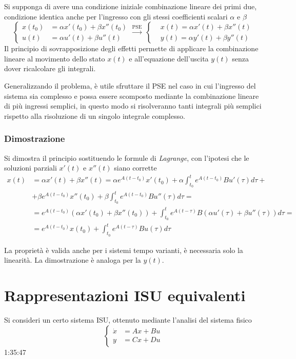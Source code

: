 Si supponga di avere una condizione iniziale combinazione lineare dei primi
due, condizione identica anche per l'ingresso con gli stessi coefficienti
scalari $\alpha$ e $\beta$
$$\left\{\begin{aligned}
x(t_0) &= \alpha x'(t_0) + \beta x''(t_0)\\
u(t) &= \alpha u'(t) + \beta u''(t)
\end{aligned}\right.\stackrel{\text{PSE}}{\longrightarrow}\
\left\{\begin{aligned}
&x(t) = \alpha x'(t) + \beta x''(t)\\
&y(t) = \alpha y'(t) + \beta y''(t)
\end{aligned}\right.
$$
Il principio di sovrapposizione degli effetti permette di applicare la
combinazione lineare al movimento dello stato $x(t)$ e all'equazione
dell'uscita $y(t)$ senza dover ricalcolare gli integrali.

Generalizzando il problema, è utile sfruttare il PSE nel caso in cui l'ingresso
del sistema sia complesso e possa essere scomposto mediante la combinazione
lineare di più ingressi semplici, in questo modo si risolveranno tanti
integrali più semplici rispetto alla risoluzione di un singolo integrale
complesso.

\subsubsection{Dimostrazione}
Si dimostra il principio sostituendo le formule di \textit{Lagrange}, con
l'ipotesi che le soluzioni parziali $x'(t)$ e $x''(t)$ siano corrette
$$\begin{aligned}
x(t) &= \alpha x'(t) + \beta x''(t) = \alpha e^{A(t-t_0)}x'(t_0) + \alpha
\int_{t_0}^t e^{A(t-t_0)}Bu'(\tau)d\tau + \\
 &+ \beta e^{A(t-t_0)}x''(t_0) + \beta\int_{t_0}^t e^{A(t-t_0)} B
u''(\tau)d\tau =\\
&= e^{A(t-t_0)}\left(\alpha x'(t_0) + \beta x''(t_0)\right) + \int_{t_0}^t
e^{A(t-\tau)} B \left(\alpha u'(\tau) + \beta u''(\tau)\right) d\tau =\\
&= e^{A(t-t_0)}x(t_0)  + \int_{t_0}^t
e^{A(t-\tau)}Bu(\tau)d\tau
\end{aligned}$$

La proprietà è valida anche per i sistemi tempo varianti, è necessaria solo la
linearità.
La dimostrazione è analoga per la $y(t)$.


\section{Rappresentazioni ISU equivalenti}
Si consideri un certo sistema ISU, ottenuto mediante l'analisi del sistema
fisico
$$
\left\{\begin{aligned}
\dot{x} &= Ax + Bu \\
y & = Cx + Du
\end{aligned}\right.
$$
1:35:47
